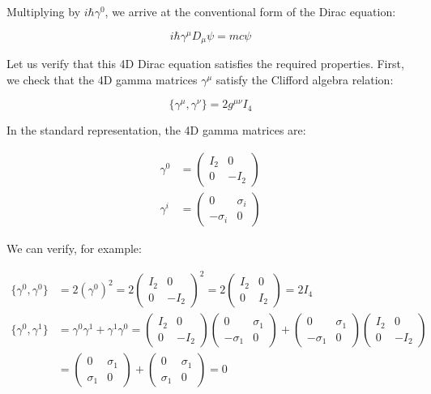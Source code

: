 \documentclass{article}
\begin{document}
Multiplying by $i\hbar\gamma^0$, we arrive at the conventional form of the Dirac equation:

\begin{equation}
i\hbar \gamma^\mu D_\mu \psi = mc \psi
\end{equation}

Let us verify that this 4D Dirac equation satisfies the required properties. First, we check that the 4D gamma matrices $\gamma^\mu$ satisfy the Clifford algebra relation:

\begin{equation}
\{\gamma^\mu, \gamma^\nu\} = 2g^{\mu\nu}I_4
\end{equation}

In the standard representation, the 4D gamma matrices are:

\begin{align}
\gamma^0 &= \begin{pmatrix} I_2 & 0 \\ 0 & -I_2 \end{pmatrix} \\
\gamma^i &= \begin{pmatrix} 0 & \sigma_i \\ -\sigma_i & 0 \end{pmatrix}
\end{align}

We can verify, for example:

\begin{align}
\{\gamma^0, \gamma^0\} &= 2(\gamma^0)^2 = 2\begin{pmatrix} I_2 & 0 \\ 0 & -I_2 \end{pmatrix}^2 = 2\begin{pmatrix} I_2 & 0 \\ 0 & I_2 \end{pmatrix} = 2I_4 \\
\{\gamma^0, \gamma^1\} &= \gamma^0\gamma^1 + \gamma^1\gamma^0 = \begin{pmatrix} I_2 & 0 \\ 0 & -I_2 \end{pmatrix}\begin{pmatrix} 0 & \sigma_1 \\ -\sigma_1 & 0 \end{pmatrix} + \begin{pmatrix} 0 & \sigma_1 \\ -\sigma_1 & 0 \end{pmatrix}\begin{pmatrix} I_2 & 0 \\ 0 & -I_2 \end{pmatrix} \\
&= \begin{pmatrix} 0 & \sigma_1 \\ \sigma_1 & 0 \end{pmatrix} + \begin{pmatrix} 0 & \sigma_1 \\ \sigma_1 & 0 \end{pmatrix} = 0
\end{align}
\end{document}
